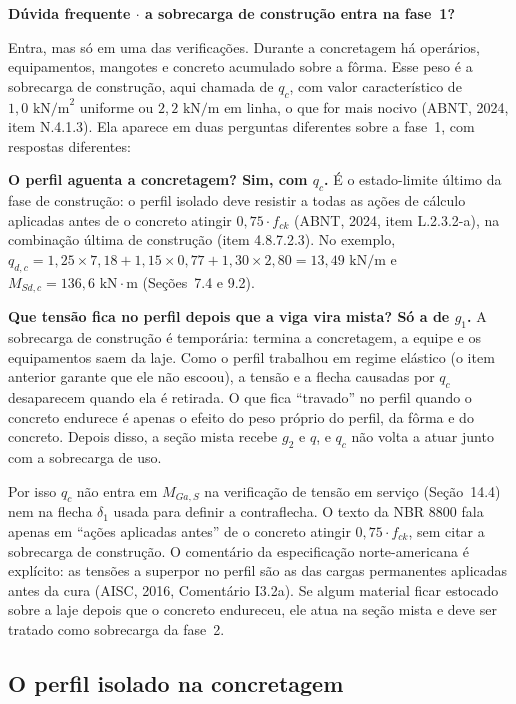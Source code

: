 \documentclass[11pt,a4paper]{article}
\newcommand{\caixaconceito}[2]{%
  \par\vspace{6pt}\noindent\colorbox{calloutbg}{%
    \parbox{\dimexpr\linewidth-2\fboxsep\relax}{%
      \vspace{4pt}\textbf{\color{primary}#1}\par\vspace{3pt}#2\vspace{4pt}%
    }%
  }\par\vspace{6pt}%
}
\begin{document}
\caixaconceito{Dúvida frequente $\cdot$ a sobrecarga de construção entra na fase~1?}{%
Entra, mas só em uma das verificações. Durante a concretagem há operários, equipamentos, mangotes e concreto acumulado sobre a fôrma. Esse peso é a sobrecarga de construção, aqui chamada de $q_c$, com valor característico de $1{,}0\text{ kN/m}^2$ uniforme ou $2{,}2\text{ kN/m}$ em linha, o que for mais nocivo (ABNT, 2024, item N.4.1.3). Ela aparece em duas perguntas diferentes sobre a fase~1, com respostas diferentes:\par\vspace{4pt}
\textbf{O perfil aguenta a concretagem? Sim, com $q_c$.} É o estado-limite último da fase de construção: o perfil isolado deve resistir a todas as ações de cálculo aplicadas antes de o concreto atingir $0{,}75\cdot f_{ck}$ (ABNT, 2024, item L.2.3.2-a), na combinação última de construção (item 4.8.7.2.3). No exemplo, $q_{d,c} = 1{,}25 \times 7{,}18 + 1{,}15 \times 0{,}77 + 1{,}30 \times 2{,}80 = 13{,}49\text{ kN/m}$ e $M_{Sd,c} = 136{,}6\text{ kN}\cdot\text{m}$ (Seções~7.4 e 9.2).\par\vspace{4pt}
\textbf{Que tensão fica no perfil depois que a viga vira mista? Só a de $g_1$.} A sobrecarga de construção é temporária: termina a concretagem, a equipe e os equipamentos saem da laje. Como o perfil trabalhou em regime elástico (o item anterior garante que ele não escoou), a tensão e a flecha causadas por $q_c$ desaparecem quando ela é retirada. O que fica ``travado'' no perfil quando o concreto endurece é apenas o efeito do peso próprio do perfil, da fôrma e do concreto. Depois disso, a seção mista recebe $g_2$ e $q$, e $q_c$ não volta a atuar junto com a sobrecarga de uso.\par\vspace{4pt}
Por isso $q_c$ não entra em $M_{Ga,S}$ na verificação de tensão em serviço (Seção~14.4) nem na flecha $\delta_1$ usada para definir a contraflecha. O texto da NBR 8800 fala apenas em ``ações aplicadas antes'' de o concreto atingir $0{,}75\cdot f_{ck}$, sem citar a sobrecarga de construção. O comentário da especificação norte-americana é explícito: as tensões a superpor no perfil são as das cargas permanentes aplicadas antes da cura (AISC, 2016, Comentário I3.2a). Se algum material ficar estocado sobre a laje depois que o concreto endureceu, ele atua na seção mista e deve ser tratado como sobrecarga da fase~2.}

\subsection{O perfil isolado na concretagem}
\end{document}
